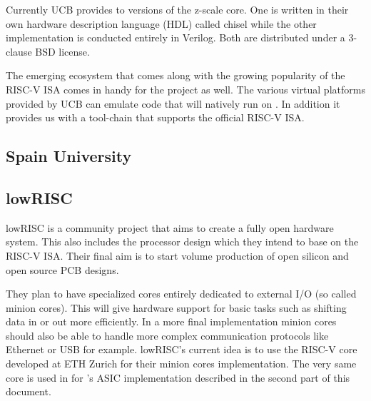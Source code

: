 Currently UCB provides to versions of the z-scale core. One is written in their own hardware description language (HDL) called chisel while the other implementation is conducted entirely in Verilog. Both are distributed under a 3-clause BSD license.

The emerging ecosystem that comes along with the growing popularity of the RISC-V ISA comes in handy for the \pulpino project as well. The various virtual platforms provided by UCB can emulate code that will natively run on \pulpino. In addition it provides us with a tool-chain that supports the official RISC-V ISA.

\subsection{Spain University}

\subsection{lowRISC}

lowRISC is a community project that aims to create a fully open hardware system. This also includes the processor design which they intend to base on the RISC-V ISA. Their final aim is to start volume production of open silicon and open source PCB designs.

They plan to have specialized cores entirely dedicated to external I/O (so called minion cores). This will give hardware support for basic tasks such as shifting data in or out more efficiently. In a more final implementation minion cores should also be able to handle more complex communication protocols like Ethernet or USB for example. lowRISC's current idea is to use the RISC-V core developed at ETH Zurich for their minion cores implementation. The very same core is used in for \pulpino's ASIC implementation described in the second part of this document.



